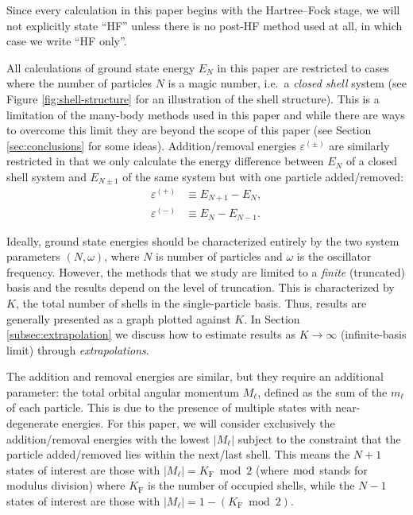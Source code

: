 Since every calculation in this paper begins with the Hartree--Fock
stage, we will not explicitly state ``HF'' unless there is no post-HF
method used at all, in which case we write ``HF only''.

All calculations of ground state energy $E_N$ in this paper are
restricted to cases where the number of particles $N$ is a magic
number, i.e.\ a \textit{closed shell} system (see
Figure \ref{fig:shell-structure} for an illustration of the shell
structure).  This is a limitation of the many-body methods used in
this paper and while there are ways to overcome this limit they are
beyond the scope of this paper (see Section \ref{sec:conclusions} for
some ideas).  Addition/removal energies $\varepsilon^{(\pm)}$ are
similarly restricted in that we only calculate the energy difference
between $E_N$ of a closed shell system and $E_{N \pm 1}$ of the same
system but with one particle added/removed:
\begin{align*}
  \varepsilon^{(+)} &\equiv E_{N + 1} - E_N, \\
  \varepsilon^{(-)} &\equiv E_N - E_{N - 1}.
\end{align*}

Ideally, ground state energies should be characterized entirely by the
two system parameters $(N, \omega)$, where $N$ is number of particles
and $\omega$ is the oscillator frequency.  However, the methods that
we study are limited to a \emph{finite} (truncated) basis and
the results depend on the level of truncation.
This is characterized by $K$, the total number of shells in the
single-particle basis.  Thus, results are generally presented as a
graph plotted against $K$.  In Section \ref{subsec:extrapolation}
we discuss how to estimate results as $K \to \infty$ (infinite-basis
limit) through \textit{extrapolations}.

The addition and removal energies are similar, but they require an
additional parameter: the total orbital angular momentum $M_\ell$,
defined as the sum of the $m_\ell$ of each particle.  This is due to
the presence of multiple states with near-degenerate energies.  For
this paper, we will consider exclusively the addition/removal energies
with the lowest $|M_\ell|$ subject to the constraint that the particle
added/removed lies within the next/last shell.  This means the $N + 1$
states of interest are those with $|M_\ell| = K_{\mathrm{F}} \bmod 2$ (where $\bmod$ stands for modulus division)
where $K_{\mathrm{F}}$ is the number of occupied shells, while the $N
- 1$ states of interest are those with $|M_\ell| = 1 -
(K_{\mathrm{F}} \bmod 2)$.

